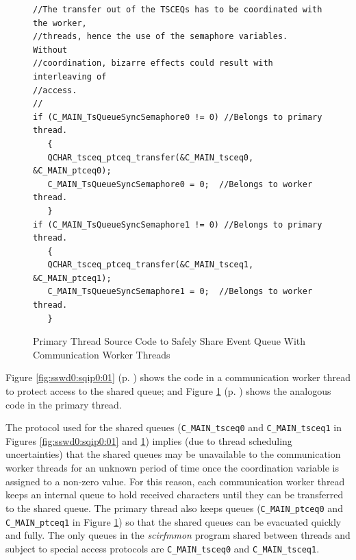 \documentclass[letterpaper,10pt,titlepage]{article}
\newcommand{\productname}{scirfmmon}
\newcommand{\productnameemph}{\emph{\productname}}
\begin{document}
\begin{figure}
\centering
\begin{small}
\begin{verbatim}
//The transfer out of the TSCEQs has to be coordinated with the worker,
//threads, hence the use of the semaphore variables.  Without 
//coordination, bizarre effects could result with interleaving of
//access.
//
if (C_MAIN_TsQueueSyncSemaphore0 != 0) //Belongs to primary thread.
   {
   QCHAR_tsceq_ptceq_transfer(&C_MAIN_tsceq0, &C_MAIN_ptceq0);
   C_MAIN_TsQueueSyncSemaphore0 = 0;  //Belongs to worker thread.
   }
if (C_MAIN_TsQueueSyncSemaphore1 != 0) //Belongs to primary thread.
   {
   QCHAR_tsceq_ptceq_transfer(&C_MAIN_tsceq1, &C_MAIN_ptceq1);
   C_MAIN_TsQueueSyncSemaphore1 = 0;  //Belongs to worker thread.
   }
\end{verbatim}
\end{small}
\caption{Primary Thread Source Code to Safely Share Event Queue With
         Communication Worker Threads}
\label{fig:sswd0:sqip0:02}
\end{figure}

Figure \ref{fig:sswd0:sqip0:01} (p. \pageref{fig:sswd0:sqip0:01}) shows
the code in a communication worker thread to protect access to the
shared queue; and Figure \ref{fig:sswd0:sqip0:02} 
(p. \pageref{fig:sswd0:sqip0:02}) shows the analogous code in the
primary thread.

The protocol used for the shared queues (\texttt{C\_MAIN\_tsceq0}
and \texttt{C\_MAIN\_tsceq1} in Figures \ref{fig:sswd0:sqip0:01}
and \ref{fig:sswd0:sqip0:02}) implies (due to thread scheduling
uncertainties) that the shared queues may be unavailable to the
communication worker threads for an unknown period of time once
the coordination variable is assigned to a non-zero value.
For this reason, each communication worker thread keeps an internal
queue to hold received characters until they can be transferred to the
shared queue.  The primary thread also keeps queues 
(\texttt{C\_MAIN\_ptceq0} and \texttt{C\_MAIN\_ptceq1} in
Figure \ref{fig:sswd0:sqip0:02}) so that the shared queues can be
evacuated quickly and fully.  The only queues in the
\productnameemph{} program
shared between threads and subject to special
access protocols are \texttt{C\_MAIN\_tsceq0}
and \texttt{C\_MAIN\_tsceq1}.


\end{document}

